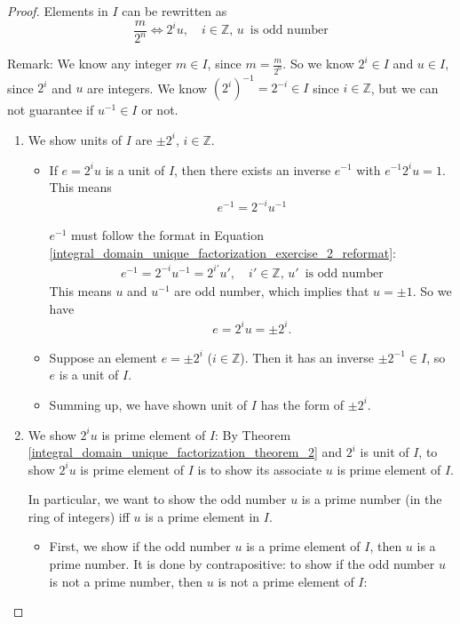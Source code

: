 \documentclass[utf8]{ctexbook}
\theoremstyle{definition}
\begin{document}
\begin{proof}
Elements in $I$ can be rewritten as
\begin{equation}\label{integral_domain_unique_factorization_exercise_2_reformat}
\frac{m}{2^n} \Longleftrightarrow 2^i u , \quad i \in \mathbb{Z}, \, u \, \mbox{ is odd number}
\end{equation}

Remark: We know any integer $m \in I$, since $m = \frac{m}{2^0}$. So we know $2^i \in I$ and $u \in I$, since $2^i$ and $u$ are integers. We know $(2^{i})^{-1} = 2^{-i} \in I$ since $i \in \mathbb{Z}$, but we can not guarantee if $u^{-1} \in I$ or not.   

\begin{enumerate}
\item{We show units of $I$ are $\pm 2^i$, $i \in \mathbb{Z}$.}
\begin{itemize}
\item{If $e = 2^i u$ is a unit of $I$, then there exists an inverse $e^{-1}$ with $e^{-1} 2^i u = 1 $. This means 
\begin{align*}
e^{-1} = 2^{-i} u^{-1}
\end{align*}

$e^{-1}$ must follow the format in Equation \ref{integral_domain_unique_factorization_exercise_2_reformat}:
\begin{align*}
e^{-1} = 2^{-i} u^{-1} = 2^{i'} u', \quad i' \in \mathbb{Z}, \, u' \, \mbox{ is odd number}
\end{align*}
This means $u$ and $u^{-1}$ are odd number, which implies that $u = \pm 1$. So we have
\begin{align*}
e = 2^i u = \pm 2^i .
\end{align*}
}
\item{Suppose an element $e = \pm 2^i$ ($i \in \mathbb{Z}$). Then it has an inverse $\pm 2^{-1} \in I$, so $e$ is a unit of $I$.
}
\item{Summing up, we have shown unit of $I$ has the form of $\pm 2^{i}$.}
\end{itemize}
\item{We show $2^i u $ is prime element of $I$: By Theorem \ref{integral_domain_unique_factorization_theorem_2} and $2^i$ is unit of $I$, to show $2^i u $ is prime element of $I$ is to show its associate $u$ is prime element of $I$.

In particular, we want to show the odd number $u$ is a prime number (in the ring of integers) iff $u$ is a prime element in $I$.}
\begin{itemize}
\item{First, we show if the odd number $u$ is a prime element of $I$, then $u$ is a prime number. It is done by contrapositive: to show if the odd number $u$ is not a prime number, then $u$ is not a prime element of $I$:

}
\end{itemize}
\end{enumerate}
\end{proof}
\end{document}
